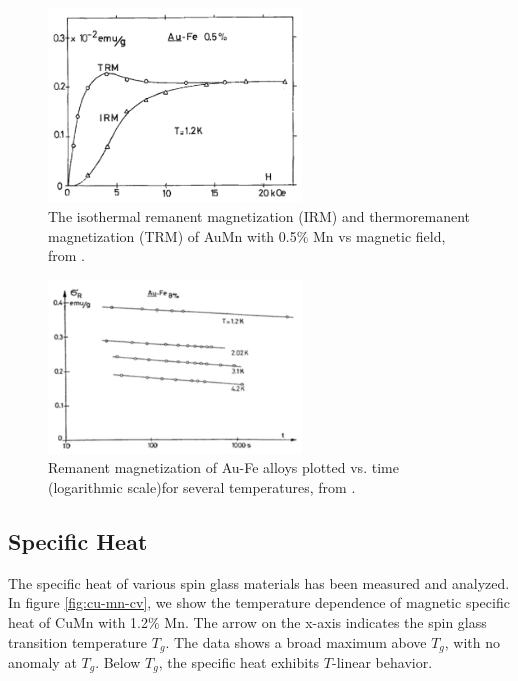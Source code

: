 
\begin{figure}
  \centering
  \includegraphics[width=0.6\textwidth]{img/trm-irm.png}
  \caption{\label{fig:trm-irm}The isothermal remanent magnetization (IRM) and 
thermoremanent magnetization (TRM) of AuMn with 0.5\% Mn vs magnetic field, 
from \citet{tholence:jpa-00215633}.}
\end{figure}

\begin{figure}
  \centering
  \includegraphics[width=0.6\textwidth]{img/remenant.png}
  \caption{ \label{fig:au-fe-remanent}Remanent magnetization of Au-Fe alloys plotted vs. time (logarithmic scale)for several temperatures, from \citet{Holtzberg1977}.}
\end{figure}

\subsection{Specific Heat}

The specific heat of various spin glass materials has been measured and analyzed. 
In figure \ref{fig:cu-mn-cv}, we show the temperature dependence of magnetic 
specific heat of CuMn with 1.2\% Mn. The arrow on the x-axis indicates the spin glass
transition temperature $T_g$. The data shows a broad maximum above $T_g$, with no
anomaly at $T_g$. Below $T_g$, the specific heat exhibits $T$-linear behavior.

